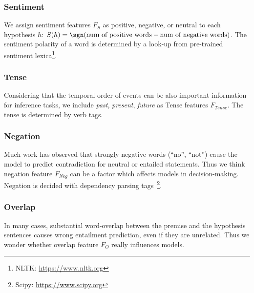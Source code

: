 %

\subsubsection{Sentiment}

We assign sentiment features $F_{S}$ as 
positive, negative, or neutral to each hypothesis $h$: 
$S(h) = \sgn(\mbox{num of positive words} - \mbox{num of negative words})$.
The sentiment polarity of a word
is determined by a look-up from pre-trained
sentiment lexica\footnote{NLTK: \url{https://www.nltk.org}}. 

\subsubsection{Tense}

Considering that the temporal order of events can be also 
important information for inference tasks, we include 
\textit{past}, \textit{present}, \textit{future} as Tense features $F_{Tense}$. 
The tense is determined by verb tags.
\subsubsection{Negation}

Much work has observed that strongly negative words (``no'', ``not'') 
cause the model to predict contradiction for
neutral or entailed statements. Thus we think negation feature 
$F_{Neg}$ can be a factor which affects models in decision-making. 
Negation is decided with dependency parsing tags~\footnote{Scipy: \url{https://www.scipy.org}}.

\subsubsection{Overlap}
In many cases, substantial word-overlap between the premise and the
hypothesis sentences causes wrong entailment prediction, 
even if they are unrelated. 
Thus we wonder 
whether overlap feature $F_{O}$ really influences models.

